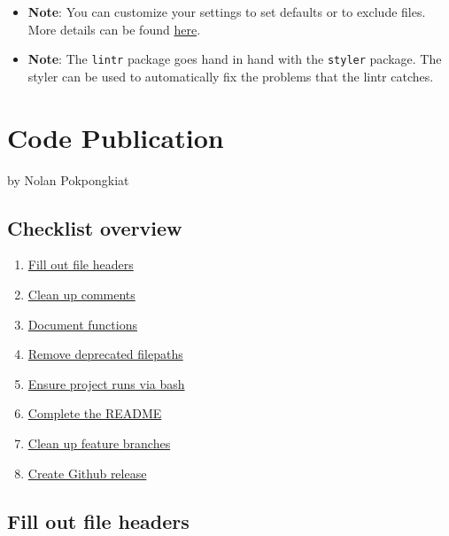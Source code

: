 \documentclass[
]{book}
\providecommand{\tightlist}{%
  \setlength{\itemsep}{0pt}\setlength{\parskip}{0pt}}
\begin{document}
\begin{enumerate}
  \begin{itemize}
  \tightlist
  \item
    \textbf{Note}: You can customize your settings to set defaults or to exclude files. More details can be found \href{https://cran.r-project.org/web/packages/lintr/readme/README.html\#project-configuration}{here}.
  \item
    \textbf{Note}: The \texttt{lintr} package goes hand in hand with the \texttt{styler} package. The styler can be used to automatically fix the problems that the lintr catches.
  \end{itemize}
\end{enumerate}

\hypertarget{code-publication}{%
\chapter{Code Publication}\label{code-publication}}

by Nolan Pokpongkiat

\hypertarget{checklist-overview}{%
\section{Checklist overview}\label{checklist-overview}}

\begin{enumerate}
\def\labelenumi{\arabic{enumi}.}
\tightlist
\item
  \protect\hyperlink{fill-out-file-headers}{Fill out file headers}
\item
  \protect\hyperlink{clean-up-comments}{Clean up comments}
\item
  \protect\hyperlink{document-functions}{Document functions}
\item
  \protect\hyperlink{remove-deprecated-filepaths}{Remove deprecated filepaths}
\item
  \protect\hyperlink{ensure-project-runs-via-bash}{Ensure project runs via bash}
\item
  \protect\hyperlink{complete-the-readme}{Complete the README}
\item
  \protect\hyperlink{clean-up-feature-branches}{Clean up feature branches}
\item
  \protect\hyperlink{create-github-release}{Create Github release}
\end{enumerate}

\hypertarget{fill-out-file-headers}{%
\section{Fill out file headers}\label{fill-out-file-headers}}
\end{document}
